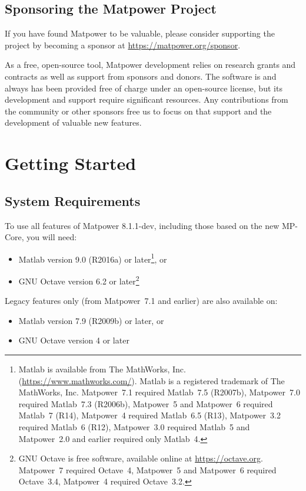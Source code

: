 \documentclass[12pt]{article}
\newcommand{\mpver}[0]{8.1.1-dev}
\newcommand{\matlab}[0]{{\sc Matlab}}
\newcommand{\matpower}[0]{{\sc Matpower}}
\newcommand{\mpcore}{{MP-Core}}
\numberwithin{equation}{section}
\numberwithin{table}{section}
\numberwithin{figure}{section}
\begin{document}
\subsection{Sponsoring the \matpower{} Project}
\label{sec:sponsor}

If you have found \matpower{} to be valuable, please consider supporting the project by becoming a sponsor at \url{https://matpower.org/sponsor}.

As a free, open-source tool, \matpower{} development relies on research grants and contracts as well as support from sponsors and donors. The software is and always has been provided free of charge under an open-source license, but its development and support require significant resources. Any contributions from the community or other sponsors free us to focus on that support and the development of valuable new features.

\clearpage
\section{Getting Started}


\subsection{System Requirements}
\label{sec:sysreq}
To use all features of \matpower{} \mpver{}, including those based on the new \mpcore{}, you will need:
\begin{itemize}
\item \matlab{}\textsuperscript{\tiny \textregistered} version 9.0 (R2016a) or later\footnote{\matlab{} is available from The MathWorks, Inc. (\url{https://www.mathworks.com/}). \matlab{} is a registered trademark of The MathWorks, Inc. \matpower{}~7.1 required \matlab{}~7.5 (R2007b), \matpower{}~7.0 required \matlab{}~7.3 (R2006b), \matpower{}~5 and \matpower{}~6 required \matlab{}~7 (R14), \matpower{}~4 required \matlab{}~6.5 (R13), \matpower{}~3.2 required \matlab{}~6 (R12), \matpower{}~3.0 required \matlab{}~5 and \matpower{}~2.0 and earlier required only \matlab{}~4. }, or
\item GNU Octave version 6.2 or later\footnote{GNU Octave \cite{octave} is free software, available online at \url{https://octave.org}. \matpower{}~7 required Octave~4, \matpower{}~5 and \matpower{}~6 required Octave~3.4, \matpower{}~4 required Octave~3.2.}
\end{itemize}
Legacy features only (from \matpower{}~7.1 and earlier) are also available on:
\begin{itemize}
\item \matlab{} version 7.9 (R2009b) or later, or
\item GNU Octave version 4 or later
\end{itemize}
\end{document}
